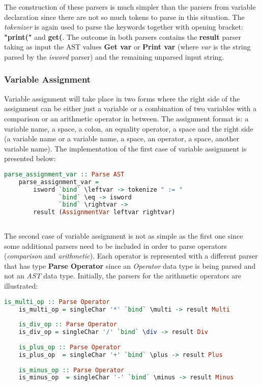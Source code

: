 \documentclass[a4paper, onecolumn]{article}
\begin{document}
    \noindent The construction of these parsers is much simpler than the parsers from variable declaration since there are not so much tokens to parse in this situation. The \textit{tokenizer} is again used to parse the keywords together with opening bracket: \textbf{"print("} and \textbf{get(}. The outcome in both parsers contains the \textbf{result} parser taking as input the AST values \textbf{Get var} or \textbf{Print var} (where \textit{var} is the string parsed by the \textit{isword} parser) and the remaining unparsed input string.
    
    
    \subsubsection{Variable Assignment}
    
    Variable assignment will take place in two forms where the right side of the assignment can be either just a variable or a combination of two variables with a comparison or an arithmetic operator in between. The assignment format is: a variable name, a space, a colon, an equality operator, a space and the right side (a variable name or a variable name, a space, an operator, a space, another variable name). The implementation of the first case of variable assignment is presented below:  
    
    \begin{tcolorbox}
    \begin{lstlisting}[language=Haskell] 
    parse_assignment_var :: Parse AST
    parse_assignment_var = 
        isword `bind` \leftvar -> tokenize " := " 
               `bind` \eq -> isword 
               `bind` \rightvar -> 
        result (AssignmentVar leftvar rightvar) 
     
     \end{lstlisting}
    \end{tcolorbox}
    
    \noindent The second case of variable assignment is not as simple as the first one since some additional parsers need to be included in order to parse operators (\textit{comparison} and \textit{arithmetic}). Each operator is represented with a different parser that has type \textbf{Parse Operator} since an \textit{Operator} data type is being parsed and not an \textit{AST} data type. Initially, the parsers for the arithmetic operators are illustrated: 
    
    \begin{tcolorbox}
    \begin{lstlisting}[language=Haskell] 
    is_multi_op :: Parse Operator
    is_multi_op = singleChar '*' `bind` \multi -> result Multi
    
    is_div_op :: Parse Operator
    is_div_op = singleChar '/' `bind` \div -> result Div
    
    is_plus_op :: Parse Operator
    is_plus_op  = singleChar '+' `bind` \plus -> result Plus
    
    is_minus_op :: Parse Operator
    is_minus_op  = singleChar '-' `bind` \minus -> result Minus
    \end{lstlisting}
    \end{tcolorbox}
    
\end{document}
